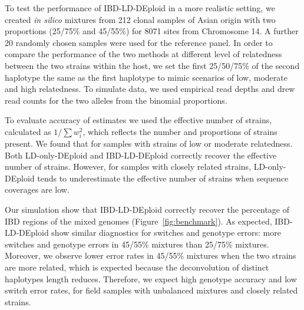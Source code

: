\documentclass[9pt,lineno]{elife}
\begin{document}
To test the performance of IBD-LD-DEploid in a more realistic setting, we created {\it in silico} mixtures from 212 clonal samples of Asian origin with two proportions (25/75\% and 45/55\%) for 8071 sites from Chromosome 14. A further 20 randomly chosen samples were used for the reference panel. In order to compare the performance of the two methods at different level of relatedness between the two strains within the host, we set the first 25/50/75\% of the second haplotype the same as the first haplotype to mimic scenarios of low, moderate and high relatedness. To simulate data, we used empirical read depths and drew read counts for the two alleles from the binomial proportions.

To evaluate accuracy of estimates we used the effective number of strains, calculated as $1/\sum w_{i}^{2}$, which reflects the number and proportions of strains present. We found that for samples with strains of low or moderate relatedness. Both LD-only-DEploid and IBD-LD-DEploid correctly recover the effective number of strains. However, for samples with closely related strains, LD-only-DEploid tends to underestimate the effective number of strains when sequence coverages are low.

Our simulation show that IBD-LD-DEploid correctly recover the percentage of IBD regions of the mixed genomes (Figure~\ref{fig:benchmark}). As expected, IBD-LD-DEploid show similar diagnostics for switches and genotype errors: more switches and genotype errors in 45/55\% mixtures than 25/75\% mixtures. Moreover, we observe lower error rates in 45/55\% mixtures when the two strains are more related, which is expected because the deconvolution of distinct haplotypes length reduces. Therefore, we expect high genotype accuracy and low switch error rates, for field samples with unbalanced mixtures and closely related strains.
\end{document}
